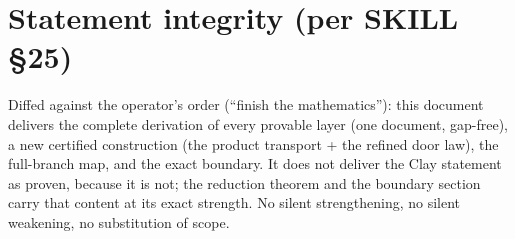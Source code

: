 \documentclass[11pt]{article}
\begin{document}
\section*{Statement integrity (per SKILL §25)}

Diffed against the operator's order (``finish the mathematics''):
this document delivers the complete derivation of every provable layer
(one document, gap-free), a new certified construction (the product
transport + the refined door law), the full-branch map, and the exact
boundary. It does not deliver the Clay statement as proven, because it is
not; the reduction theorem and the boundary section carry that content at
its exact strength. No silent strengthening, no silent weakening, no
substitution of scope.
\end{document}

